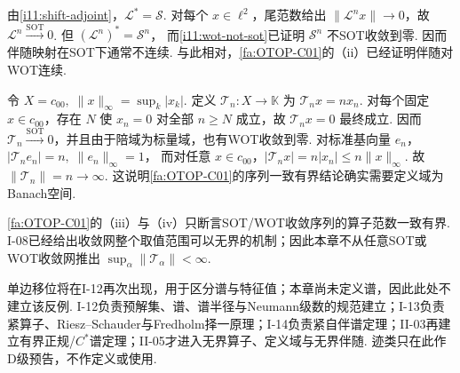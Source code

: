 \begin{FACounterexample}[伴随运算一般不关于强算子拓扑连续]\label{i11:adjoint-not-sot}
由\autoref{i11:shift-adjoint}，\(\displaystyle \mathcal L^*=\mathcal S\). 对每个 \(\displaystyle x\in\ell^2\)，尾范数给出 \(\displaystyle \|\mathcal L^nx\|\to0\)，故 \(\displaystyle \mathcal L^n\overset{\mathrm{SOT}}{\longrightarrow}0\). 但
\(\displaystyle (\mathcal L^n)^*=\mathcal S^n\)，
而\autoref{i11:wot-not-sot}已证明 \(\displaystyle \mathcal S^n\) 不SOT收敛到零. 因而伴随映射在SOT下通常不连续. 与此相对，\autoref{fa:OTOP-C01}的（ii）已经证明伴随对WOT连续.
\end{FACounterexample}

\begin{FACounterexample}[不完备定义域上的算子范数失控]\label{i11:incomplete-domain}
令
\(\displaystyle X=c_{00}, \; \|x\|_\infty=\sup_k|x_k|\).
定义 \(\displaystyle \mathcal T_n:X\to\mathbb K\) 为
\(\displaystyle \mathcal T_nx=nx_n\).
对每个固定 \(\displaystyle x\in c_{00}\)，存在 \(\displaystyle N\) 使 \(\displaystyle x_n=0\) 对全部 \(\displaystyle n\geqslant N\) 成立，故 \(\displaystyle \mathcal T_nx=0\) 最终成立. 因而 \(\displaystyle \mathcal T_n\overset{\mathrm{SOT}}{\longrightarrow}0\)，并且由于陪域为标量域，也有WOT收敛到零. 对标准基向量 \(\displaystyle e_n\)，
\(\displaystyle |\mathcal T_ne_n|=n, \; \|e_n\|_\infty=1\)，
而对任意 \(\displaystyle x\in c_{00}\)，\(\displaystyle |\mathcal T_nx|=n|x_n|\leqslant n\|x\|_\infty\). 故
\(\displaystyle \|\mathcal T_n\|=n\longrightarrow\infty\).
这说明\autoref{fa:OTOP-C01}的序列一致有界结论确实需要定义域为Banach空间.
\end{FACounterexample}

\begin{FAWarning}[序列与任意网的边界]
\autoref{fa:OTOP-C01}的（iii）与（iv）只断言SOT/WOT收敛序列的算子范数一致有界. I-08已经给出收敛网整个取值范围可以无界的机制；因此本章不从任意SOT或WOT收敛网推出 \(\displaystyle \sup_\alpha\|\mathcal T_\alpha\|<\infty\).
\end{FAWarning}

\begin{FARemark}[后续章节边界]
单边移位将在I-12再次出现，用于区分谱与特征值；本章尚未定义谱，因此此处不建立该反例. I-12负责预解集、谱、谱半径与Neumann级数的规范建立；I-13负责紧算子、Riesz--Schauder与Fredholm择一原理；I-14负责紧自伴谱定理；II-03再建立有界正规/\(\displaystyle C^*\)谱定理；II-05才进入无界算子、定义域与无界伴随. 迹类只在此作D级预告，不作定义或使用.
\end{FARemark}

